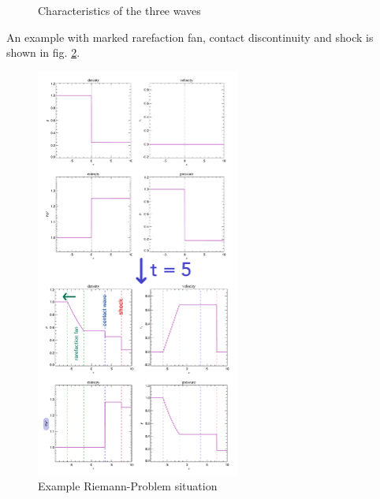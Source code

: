 \begin{figure}[htb!]
    \centering
    
    \caption{Characteristics of the three waves}
    \label{fig:riemann_problem_characteristics}
\end{figure}

An example with marked rarefaction fan, contact discontinuity and shock is shown in fig. \ref{fig:riemann_problem_example}.

\begin{figure}[htb!]
    \centering
    \includegraphics[width=0.6\textwidth]{figures/riemann_problem_example.pdf}
    \caption{Example Riemann-Problem situation}
    \label{fig:riemann_problem_example}
\end{figure}



